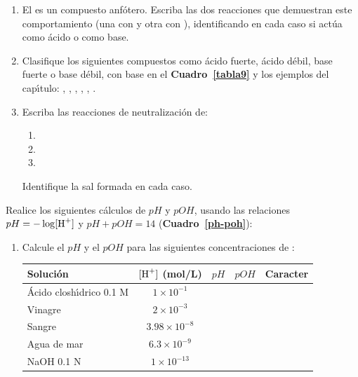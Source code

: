 \begin{bloque_ejercicios}
\begin{ejercicios}
\begin{enumerate}[label=\alph*)]
    \item El  es un compuesto anf\'otero. Escriba las
          dos reacciones que demuestran este comportamiento
          (una con  y otra con ), identificando
          en cada caso si act\'ua como \'acido o como base.

    \item Clasifique los siguientes compuestos como \'acido fuerte,
          \'acido d\'ebil, base fuerte o base d\'ebil, con base en el
          \textbf{Cuadro~\ref{tabla9}} y los ejemplos del cap\'{\i}tulo:
          , , , , ,
          .

    \item Escriba las reacciones de neutralizaci\'on de:
          \begin{enumerate}[label=\roman*)]
              \item {}
              \item {}
              \item {}
          \end{enumerate}
          Identifique la sal formada en cada caso.
\end{enumerate}

\item Realice los siguientes c\'alculos de $pH$ y $pOH$, usando las
relaciones $pH = -\log[\ce{H+}]$ y $pH + pOH = 14$
(\textbf{Cuadro~\ref{ph-poh}}):

\begin{enumerate}[label=\alph*)]
    \item Calcule el $pH$ y el $pOH$ para las siguientes
          concentraciones de :

{%
\centering
\begin{tabular}{lcccc}
\toprule
\textbf{Soluci\'on} & $[\ce{H+}]$ (mol/L) & $pH$ & $pOH$ &
\textbf{Caracter} \\
\midrule
\'Acido closh\'{\i}drico 0.1 M & $1\times10^{-1}$ & & & \\
Vinagre            & $2\times10^{-3}$  & & & \\
Sangre             & $3.98\times10^{-8}$ & & & \\
Agua de mar        & $6.3\times10^{-9}$ & & & \\
NaOH 0.1 N        & $1\times10^{-13}$  & & & \\
\bottomrule
\end{tabular}
\par
}%


\end{enumerate}
\end{ejercicios}
\end{bloque_ejercicios}
